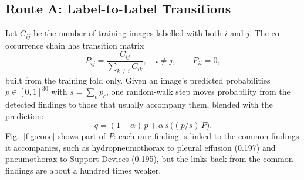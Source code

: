 \documentclass[conference]{IEEEtran}
\begin{document}
\subsection{Route A: Label-to-Label Transitions}
\label{sec:mk-labelgraph}
Let $C_{ij}$ be the number of training images labelled with both $i$ and $j$. The co-occurrence chain has transition matrix
\begin{equation}
P_{ij} = \frac{C_{ij}}{\sum_{k \neq i} C_{ik}}, \quad i \neq j, \qquad P_{ii} = 0,
\label{eq:transition}
\end{equation}
built from the training fold only. Given an image's predicted probabilities $p \in [0,1]^{30}$ with $s = \sum_c p_c$, one random-walk step moves probability from the detected findings to those that usually accompany them, blended with the prediction:
\begin{equation}
q = (1 - \alpha)\, p + \alpha\, s\, \bigl((p/s)\, P\bigr).
\label{eq:smoothing}
\end{equation}
Fig.~\ref{fig:cooc} shows part of $P$: each rare finding is linked to the common findings it accompanies, such as hydropneumothorax to pleural effusion (0.197) and pneumothorax to Support Devices (0.195), but the links back from the common findings are about a hundred times weaker.
\end{document}
